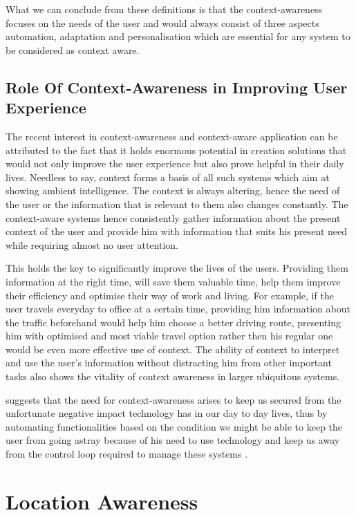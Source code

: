 \documentclass[12pt]{report}
\begin{document}
What we can conclude from these definitions is that the context-awareness focuses on the needs of the user and would always consist of three aspects automation, adaptation and personalisation \cite{nelson1998context} which are essential for any system to be considered as context aware.

\section {Role Of Context-Awareness in Improving User Experience}

The recent interest in context-awareness and context-aware application can be attributed to the fact that it holds enormous potential in creation solutions that would not only improve the user experience but also prove helpful in their daily lives. Needless to say, context forms a basis of all such systems which aim at showing ambient intelligence. The context is always altering, hence the need of the user or the information that is relevant to them also changes constantly. The context-aware systems hence consistently gather information about the present context of the user and provide him with information that suits his present need while requiring almost no user attention.


This holds the key to significantly improve the lives of the users. Providing them information at the right time, will save them valuable time, help them improve their efficiency and optimise their way of work and living. For example, if the user travels everyday to office at a certain time, providing him information about the traffic beforehand would help him choose a better driving route, presenting him with optimised and most viable travel option rather then his regular one would be even more effective use of context. The ability of context to interpret and use the user's information without distracting him from other important tasks also shows the vitality of context awareness in larger ubiquitous systems. 

\cite{moran2001introduction} suggests that the need for context-awareness arises to keep us secured from the unfortunate negative impact technology has in our day to day lives, thus by automating functionalities based on the condition we might be able to keep the user from going astray because of his need to use technology and keep us away from the control loop required to manage these systems \cite{erickson2002some}.

\chapter{Location Awareness}
\end{document}
